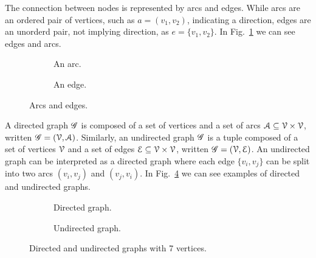 \documentclass[../main.tex]{subfiles}
\begin{document}
The connection between nodes is represented by arcs and edges. While arcs are an ordered pair of vertices, such as ${a=(v_{1},v_{2})}$, indicating a direction, edges are an unorderd pair, not implying direction, as ${e=\{v_{1},v_{2}\}}$.
In Fig.~\ref{fig:arc_edges} we can see edges and arcs.

\begin{figure}[h]
\begin{subfigure}[t]{.45\textwidth}
  \centering
  \caption{An arc.}
\end{subfigure}
\hfill
\begin{subfigure}[t]{.45\textwidth}
  \centering
  \caption{An edge.}
\end{subfigure}
\caption{Arcs and edges.}\label{fig:arc_edges}
\end{figure}

A directed graph $\mathscr{G}$ is composed of a set of vertices and a set of arcs ${\mathcal{A}\subseteq\mathcal{V}\times\mathcal{V}}$, written ${\mathscr{G}=(\mathcal{V},\mathcal{A})}$.
Similarly, an undirected graph $\mathscr{G}$ is a tuple composed of a set of vertices $\mathcal{V}$ and a set of edges ${\mathcal{E}\subseteq\mathcal{V}\times\mathcal{V}}$, written ${\mathscr{G}=(\mathcal{V},\mathcal{E})}$.
An undirected graph can be interpreted as a directed graph where each edge $\{v_{i},v_{j}\}$ can be split into two arcs $(v_{i},v_{j})$ and $(v_{j},v_{i})$.
In Fig.~\ref{fig:directed_undirected_graphs} we can see examples of directed and undirected graphs.

\begin{figure}[h]
  \centering
  \begin{subfigure}[t]{.45\textwidth}
    \centering
    \caption{Directed graph.}\label{fig:graph}
  \end{subfigure}
  \hfill
  \begin{subfigure}[t]{.45\textwidth}
    \centering
    \caption{Undirected graph.}\label{fig:undirected_graph}
  \end{subfigure}
    \caption{Directed and undirected graphs with 7 vertices.}\label{fig:directed_undirected_graphs}
\end{figure}
\end{document}
